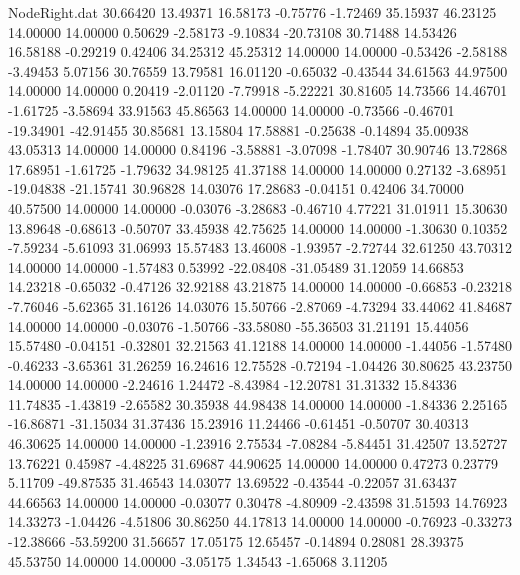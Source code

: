 \begin{filecontents}{NodeRight.dat}
  30.66420   13.49371   16.58173    -0.75776   -1.72469   35.15937   46.23125   14.00000   14.00000    0.50629   -2.58173   -9.10834  -20.73108
  30.71488   14.53426   16.58188    -0.29219    0.42406   34.25312   45.25312   14.00000   14.00000   -0.53426   -2.58188   -3.49453    5.07156
  30.76559   13.79581   16.01120    -0.65032   -0.43544   34.61563   44.97500   14.00000   14.00000    0.20419   -2.01120   -7.79918   -5.22221
  30.81605   14.73566   14.46701    -1.61725   -3.58694   33.91563   45.86563   14.00000   14.00000   -0.73566   -0.46701  -19.34901  -42.91455
  30.85681   13.15804   17.58881    -0.25638   -0.14894   35.00938   43.05313   14.00000   14.00000    0.84196   -3.58881   -3.07098   -1.78407
  30.90746   13.72868   17.68951    -1.61725   -1.79632   34.98125   41.37188   14.00000   14.00000    0.27132   -3.68951  -19.04838  -21.15741
  30.96828   14.03076   17.28683    -0.04151    0.42406   34.70000   40.57500   14.00000   14.00000   -0.03076   -3.28683   -0.46710    4.77221
  31.01911   15.30630   13.89648    -0.68613   -0.50707   33.45938   42.75625   14.00000   14.00000   -1.30630    0.10352   -7.59234   -5.61093
  31.06993   15.57483   13.46008    -1.93957   -2.72744   32.61250   43.70312   14.00000   14.00000   -1.57483    0.53992  -22.08408  -31.05489
  31.12059   14.66853   14.23218    -0.65032   -0.47126   32.92188   43.21875   14.00000   14.00000   -0.66853   -0.23218   -7.76046   -5.62365
  31.16126   14.03076   15.50766    -2.87069   -4.73294   33.44062   41.84687   14.00000   14.00000   -0.03076   -1.50766  -33.58080  -55.36503
  31.21191   15.44056   15.57480    -0.04151   -0.32801   32.21563   41.12188   14.00000   14.00000   -1.44056   -1.57480   -0.46233   -3.65361
  31.26259   16.24616   12.75528    -0.72194   -1.04426   30.80625   43.23750   14.00000   14.00000   -2.24616    1.24472   -8.43984  -12.20781
  31.31332   15.84336   11.74835    -1.43819   -2.65582   30.35938   44.98438   14.00000   14.00000   -1.84336    2.25165  -16.86871  -31.15034
  31.37436   15.23916   11.24466    -0.61451   -0.50707   30.40313   46.30625   14.00000   14.00000   -1.23916    2.75534   -7.08284   -5.84451
  31.42507   13.52727   13.76221     0.45987   -4.48225   31.69687   44.90625   14.00000   14.00000    0.47273    0.23779    5.11709  -49.87535
  31.46543   14.03077   13.69522    -0.43544   -0.22057   31.63437   44.66563   14.00000   14.00000   -0.03077    0.30478   -4.80909   -2.43598
  31.51593   14.76923   14.33273    -1.04426   -4.51806   30.86250   44.17813   14.00000   14.00000   -0.76923   -0.33273  -12.38666  -53.59200
  31.56657   17.05175   12.65457    -0.14894    0.28081   28.39375   45.53750   14.00000   14.00000   -3.05175    1.34543   -1.65068    3.11205

\end{filecontents}
